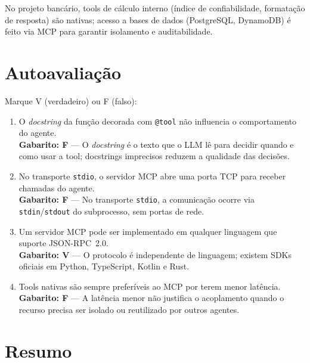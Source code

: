 No projeto banc\'ario, tools de c\'alculo interno (\'indice de
confiabilidade, formata\c{c}\~ao de resposta) s\~ao nativas; acesso
a bases de dados (PostgreSQL, DynamoDB) \'e feito via MCP para
garantir isolamento e auditabilidade.

\section{Autoavalia\c{c}\~ao}

Marque V (verdadeiro) ou F (falso):

\begin{enumerate}[leftmargin=*]
  \item O \textit{docstring} da fun\c{c}\~ao decorada com
        \texttt{@tool} n\~ao influencia o comportamento do agente. \\
        \textbf{Gabarito: F} --- O \textit{docstring} \'e o texto
        que o LLM l\^e para decidir quando e como usar a tool;
        docstrings imprecisos reduzem a qualidade das decis\~oes.

  \item No transporte \texttt{stdio}, o servidor MCP abre uma porta
        TCP para receber chamadas do agente. \\
        \textbf{Gabarito: F} --- No transporte \texttt{stdio}, a
        comunica\c{c}\~ao ocorre via \texttt{stdin}/\texttt{stdout}
        do subprocesso, sem portas de rede.

  \item Um servidor MCP pode ser implementado em qualquer linguagem
        que suporte JSON-RPC~2.0. \\
        \textbf{Gabarito: V} --- O protocolo \'e independente de
        linguagem; existem SDKs oficiais em Python, TypeScript,
        Kotlin e Rust.

  \item Tools nativas s\~ao sempre prefer\'iveis ao MCP por terem
        menor lat\^encia. \\
        \textbf{Gabarito: F} --- A lat\^encia menor n\~ao justifica
        o acoplamento quando o recurso precisa ser isolado ou
        reutilizado por outros agentes.
\end{enumerate}

\section{Resumo}

